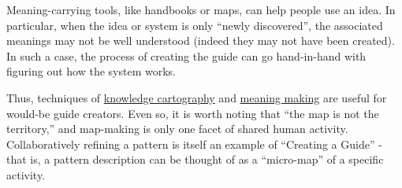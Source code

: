 Meaning-carrying tools, like handbooks or maps, can help people use an
idea. In particular, when the idea or system is only ``newly
discovered'', the associated meanings may not be well understood (indeed
they may not have been created). In such a case, the process of creating
the guide can go hand-in-hand with figuring out how the system works.

Thus, techniques of \href{http://knowledgecartography.org/}{knowledge
cartography} and
\href{http://www.hitl.washington.edu/publications/r-97-47/two.html}{meaning
making} are useful for would-be guide creators. Even so, it is worth
noting that ``the map is not the territory,'' and map-making is only one
facet of shared human activity. Collaboratively refining a pattern is
itself an example of ``Creating a Guide'' - that is, a pattern
description can be thought of as a ``micro-map'' of a specific activity.
